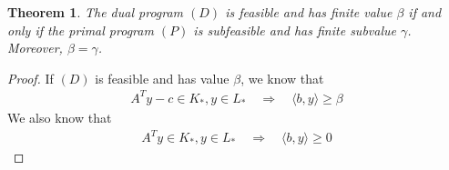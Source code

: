 \documentclass[12pt]{article}
\newtheorem*{theorem}{Theorem}
\begin{document}
    \begin{theorem}
    The dual program $(D)$ is feasible and has finite value $\beta$ if and only if the primal program $(P)$ is subfeasible and has finite subvalue $\gamma$. Moreover, $\beta = \gamma$.
    \end{theorem}
    \begin{proof}
         If $(D)$ is feasible and has value $\beta$, we know that
         \begin{align*}
            A^Ty - c \in K_*, y \in L_* \quad  \Rightarrow  \quad \langle b,y \rangle \geq \beta 
            \tag{I}
         \end{align*}
         We also know that
         \begin{align*}
             A^Ty \in K_*, y \in L_* \quad \Rightarrow \quad  \langle b,y \rangle \geq 0
             \tag{II}
         \end{align*}
         

\end{proof}
\end{document}

